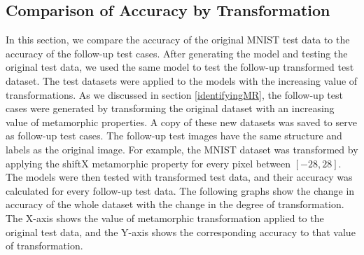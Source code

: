 \subsection{Comparison of Accuracy by Transformation}\label{4.1.1}
In this section, we compare the accuracy of the original MNIST test data to the accuracy of the follow-up test cases. After generating the model and testing the original test data, we used the same model to test the follow-up transformed test dataset. The test datasets were applied to the models with the increasing value of transformations. 
As we discussed in section \ref{identifyingMR}, the follow-up test cases were generated by transforming the original dataset with an increasing value of metamorphic properties.  A copy of these new datasets was saved to serve as follow-up test cases. The follow-up test images have the same structure and labels as the original image. For example, the MNIST dataset was transformed by applying the shiftX metamorphic property for every pixel between $[-28,28]$. The models were then tested with transformed test data, and their accuracy was calculated for every follow-up test data. The following graphs show the change in accuracy of the whole dataset with the change in the degree of transformation. The X-axis shows the value of metamorphic transformation applied to the original test data, and the Y-axis shows the corresponding accuracy to that value of transformation.

